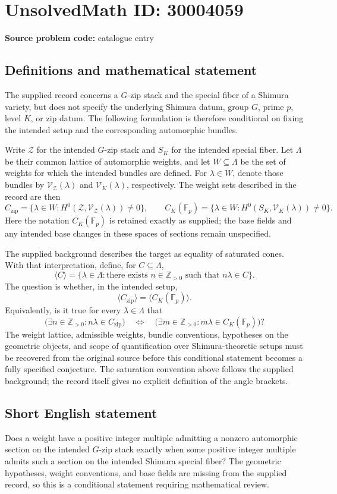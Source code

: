 \documentclass[11pt]{article}
\newcommand{\Z}{\mathbb{Z}}
\begin{document}
\section*{UnsolvedMath ID: 30004059}
\textbf{Source problem code:} catalogue entry
\subsection{Definitions and mathematical statement}
The supplied record concerns a $G$-zip stack and the special fiber of a Shimura variety, but does not specify the underlying Shimura datum, group $G$, prime $p$, level $K$, or zip datum. The following formulation is therefore conditional on fixing the intended setup and the corresponding automorphic bundles.

Write $\mathcal Z$ for the intended $G$-zip stack and $S_K$ for the intended special fiber. Let $\Lambda$ be their common lattice of automorphic weights, and let $W\subseteq\Lambda$ be the set of weights for which the intended bundles are defined. For $\lambda\in W$, denote those bundles by $\mathcal V_{\mathcal Z}(\lambda)$ and $\mathcal V_K(\lambda)$, respectively. The weight sets described in the record are then
\[
C_{\mathrm{zip}}=\{\lambda\in W:H^0(\mathcal Z,\mathcal V_{\mathcal Z}(\lambda))\ne0\},\qquad
C_K(\mathbb F_p)=\{\lambda\in W:H^0(S_K,\mathcal V_K(\lambda))\ne0\}.
\]
Here the notation $C_K(\mathbb F_p)$ is retained exactly as supplied; the base fields and any intended base changes in these spaces of sections remain unspecified.

The supplied background describes the target as equality of saturated cones. With that interpretation, define, for $C\subseteq\Lambda$,
\[
\langle C\rangle=\{\lambda\in\Lambda:\text{there exists }n\in\Z_{>0}\text{ such that }n\lambda\in C\}.
\]
The question is whether, in the intended setup,
\[
\langle C_{\mathrm{zip}}\rangle=\langle C_K(\mathbb F_p)\rangle.
\]
Equivalently, is it true for every $\lambda\in\Lambda$ that
\[
\bigl(\exists n\in\Z_{>0}:n\lambda\in C_{\mathrm{zip}}\bigr)
\quad\Longleftrightarrow\quad
\bigl(\exists m\in\Z_{>0}:m\lambda\in C_K(\mathbb F_p)\bigr)?
\]
The weight lattice, admissible weights, bundle conventions, hypotheses on the geometric objects, and scope of quantification over Shimura-theoretic setups must be recovered from the original source before this conditional statement becomes a fully specified conjecture. The saturation convention above follows the supplied background; the record itself gives no explicit definition of the angle brackets.
\subsection{Short English statement}
Does a weight have a positive integer multiple admitting a nonzero automorphic section on the intended $G$-zip stack exactly when some positive integer multiple admits such a section on the intended Shimura special fiber? The geometric hypotheses, weight conventions, and base fields are missing from the supplied record, so this is a conditional statement requiring mathematical review.
\end{document}
